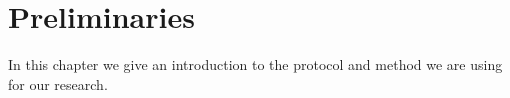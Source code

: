 \chapter{Preliminaries}\label{preliminaries}

In this chapter we give an introduction to the protocol and method we are using for our research.




